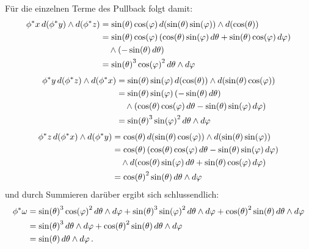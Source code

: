 \documentclass[../H_Analysis_main.tex]{subfiles}
\begin{document}
\begin{bsp}
Für die einzelnen Terme des Pullback folgt damit:
\begin{align*}
\phi^*x \, d\qty(\phi^* y) \wedge d\qty(\phi^*z) &= \sin(\theta) \cos(\varphi) \, d\qty(\sin(\theta) \sin(\varphi)) \wedge d\qty(\cos(\theta))
\\
&= \sin(\theta) \cos(\varphi) \, \qty(\cos(\theta) \sin(\varphi) \, d\theta + \sin(\theta) \cos(\varphi) \, d\varphi) 
\\
& \quad \wedge \qty(- \sin(\theta) \, d\theta)
\\
&= \sin(\theta)^3 \cos(\varphi)^2 \, d\theta \wedge d\varphi
\end{align*}
\begin{align*}
\phi^*y \, d\qty(\phi^* z) \wedge d\qty(\phi^* x) &= \sin(\theta) \sin(\varphi) \, d\qty(\cos(\theta)) \wedge d\qty(\sin(\theta) \cos(\varphi))
\\
&= \sin(\theta) \sin(\varphi) \, \qty(- \sin(\theta) \, d\theta) 
\\
& \quad \wedge \qty(\cos(\theta) \cos(\varphi) \, d\theta - \sin(\theta) \sin(\varphi) \, d\varphi) 
\\
&= \sin(\theta)^3 \sin(\varphi)^2 \, d\theta \wedge d\varphi
\end{align*}
\begin{align*}
\phi^*z \, d\qty(\phi^* x) \wedge d\qty(\phi^* y) &= \cos(\theta) \, d\qty(\sin(\theta) \cos(\varphi)) \wedge d\qty(\sin(\theta) \sin(\varphi))
\\
&= \cos(\theta) \, \qty(\cos(\theta) \cos(\varphi) \, d\theta - \sin(\theta) \sin(\varphi) \, d\varphi) 
\\
& \quad \wedge d\qty(\cos(\theta) \sin(\varphi) \, d\theta + \sin(\theta) \cos(\varphi) \, d\varphi)
\\
&= \cos(\theta)^2 \sin(\theta) \, d\theta \wedge d\varphi
\end{align*}
und durch Summieren darüber ergibt sich schlussendlich:
\begin{align}
\phi^* \omega &= \sin(\theta)^3 \cos(\varphi)^2 \, d\theta \wedge d\varphi + \sin(\theta)^3 \sin(\varphi)^2 \, d\theta \wedge d\varphi + \cos(\theta)^2 \sin(\theta) \, d\theta \wedge d\varphi
\notag\\
&= \sin(\theta)^3 \, d\theta \wedge d\varphi + \cos(\theta)^2 \sin(\theta) \, d\theta \wedge d\varphi 
\notag\\
&= \sin(\theta) \, d\theta \wedge d\varphi \, .
\end{align}


\end{bsp}
\end{document}
